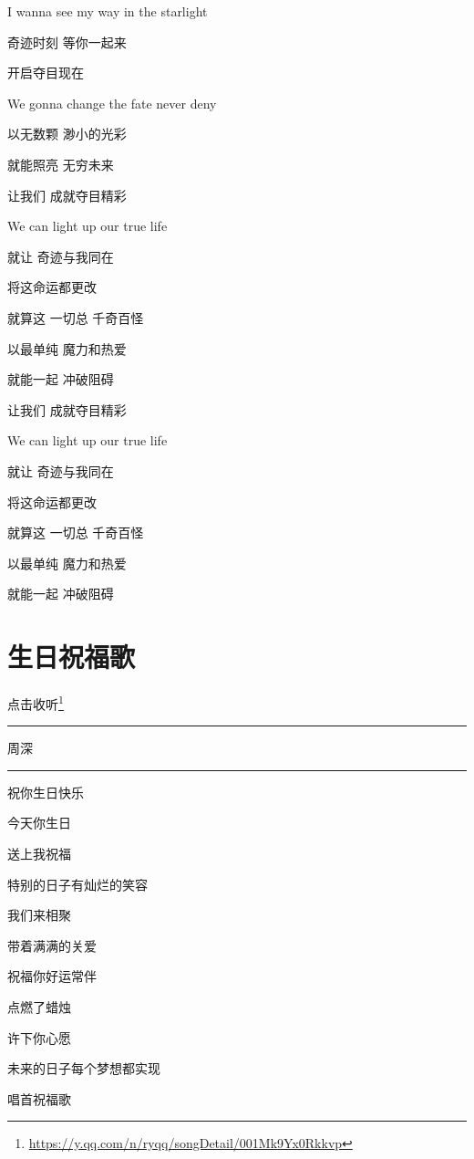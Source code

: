 \documentclass[]{ctexbook}
\renewcommand{\href}[2]{#2\footnote{\url{#1}}}
\begin{document}
I wanna see my way in the starlight

奇迹时刻 等你一起来

开启夺目现在

We gonna change the fate never deny

以无数颗 渺小的光彩

就能照亮 无穷未来

让我们 成就夺目精彩

We can light up our true life

就让 奇迹与我同在

将这命运都更改

就算这 一切总 千奇百怪

以最单纯 魔力和热爱

就能一起 冲破阻碍

让我们 成就夺目精彩

We can light up our true life

就让 奇迹与我同在

将这命运都更改

就算这 一切总 千奇百怪

以最单纯 魔力和热爱

就能一起 冲破阻碍

\section*{生日祝福歌}\label{happy-birthday}


\href{https://y.qq.com/n/ryqq/songDetail/001Mk9Yx0Rkkvp}{点击收听}

\begin{center}\rule{0.5\linewidth}{0.5pt}\end{center}

周深

\begin{center}\rule{0.5\linewidth}{0.5pt}\end{center}

祝你生日快乐

今天你生日

送上我祝福

特别的日子有灿烂的笑容

我们来相聚

带着满满的关爱

祝福你好运常伴

点燃了蜡烛

许下你心愿

未来的日子每个梦想都实现

唱首祝福歌
\end{document}
